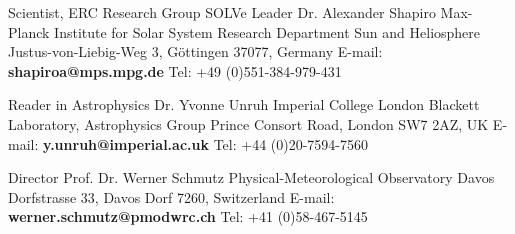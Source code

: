 

\begin{cventries}

  \cventry
    {Scientist, ERC Research Group SOLVe Leader} %
    {Dr. Alexander Shapiro} %
    {} %
    {} %
    {Max-Planck Institute for Solar System Research\newline
     Department Sun and Heliosphere\newline
     Justus-von-Liebig-Weg 3, G{\"o}ttingen 37077, Germany\newline
     E-mail: \textbf{shapiroa@mps.mpg.de}\newline
     Tel: +49 (0)551-384-979-431} %

  \cventry
    {Reader in Astrophysics} %
    {Dr. Yvonne Unruh} %
    {} %
    {} %
    {Imperial College London\newline
     Blackett Laboratory, Astrophysics Group\newline
     Prince Consort Road, London SW7 2AZ, UK\newline
     E-mail: \textbf{y.unruh@imperial.ac.uk}\newline
     Tel: +44 (0)20-7594-7560} %

  \cventry
    {Director} %
    {Prof. Dr. Werner Schmutz} %
    {} %
    {} %
    {Physical-Meteorological Observatory Davos\newline
     Dorfstrasse 33, Davos Dorf 7260, Switzerland\newline
     E-mail: \textbf{werner.schmutz@pmodwrc.ch}\newline
     Tel: +41 (0)58-467-5145} %

\end{cventries}
